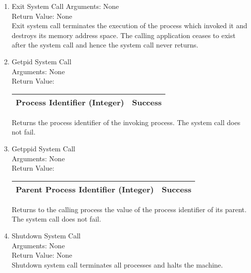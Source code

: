 \begin{enumerate}
\item{Exit System Call}
Arguments: None\\
Return Value: None\\

Exit system call terminates the execution of the process which invoked it and destroys its memory address space. The calling application ceases to exist after the system call and hence the system call never returns.


\item{Getpid System Call}\\
Arguments: None\\
Return Value:
\FloatBarrier \begin{table}[H]
\centering
\begin{tabular}{|l|l|}
\hline
Process Identifier (Integer)	& Success \\ \hline
\end{tabular}
\end{table} \FloatBarrier 

 Returns the process identifier of the invoking process. The system call does not fail.


\item{Getppid System Call}\\
Arguments: None\\
Return Value:
\FloatBarrier \begin{table}[H]
\centering
\begin{tabular}{|l|l|}
\hline
Parent Process Identifier (Integer)	& Success \\ \hline
\end{tabular}
\end{table} \FloatBarrier 

 Returns to the calling process the value of the process identifier of its parent. The system call does not fail.


\item{Shutdown System Call}\\
Arguments: None\\
Return Value: None \\

Shutdown system call terminates all processes and halts the machine. 
\end{enumerate}

